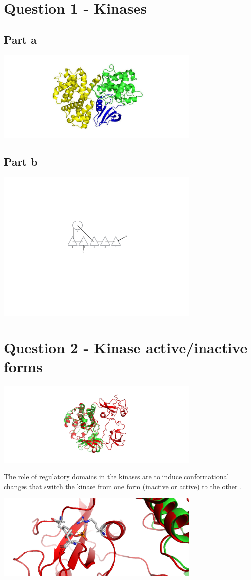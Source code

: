 \documentclass[11pt, a4paper,titlepage]{article}
\begin{document}
\setlength{\parskip}{0pt}%
\setlength{\parindent}{0pt}%
\renewcommand{\thesubsubsection}{\alph{subsubsection}.)}

\setcounter{tocdepth}{3}
\tableofcontents
\clearpage


\section{Question 1 - Kinases}
\subsection{Part a}
\includegraphics[width=10cm]{./Figures/1a.jpg}

\subsection{Part b}
\includegraphics[width=10cm]{./Figures/1b.pdf}

\section{Question 2 - Kinase active/inactive forms}
\includegraphics[width=10cm]{./Figures/2a.png}

The role of regulatory domains in the kinases are to induce
conformational changes that switch the kinase from one form (inactive
or active) to the other \cite{ConformationalPlasticityKinases}.

\includegraphics[width=10cm]{./Figures/2b.png}



\end{document}
